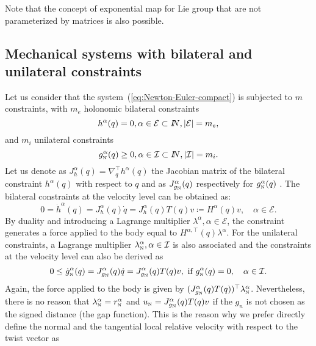 Note that the concept of exponential map for Lie group that are not parameterized by matrices is also possible.


\subsection{Mechanical systems  with bilateral and unilateral constraints}
\label{section22}


Let us consider that the system~(\ref{eq:Newton-Euler-compact}) is  subjected to $m$ constraints, with $m_{e}$ holonomic bilateral 
constraints
\begin{equation}
  \label{eq:bilateral-constraints}
  h^\alpha(q)=0, \alpha \in \mathcal{E}\subset\mbox{\rm $I\!\!N$},  |\mathcal E| = m_e,
\end{equation}
and  $m_{i}$ unilateral constraints
\begin{equation}
  \label{eq:unilateral-constraints}
  g_{{\hbox{\tiny{N}}}}^\alpha(q)\geq 0, \alpha \in \mathcal{I}\subset\mbox{\rm $I\!\!N$},  |\mathcal I| = m_i.
\end{equation} 
%
Let us denote as $J^\alpha_h(q) = \nabla^\top_q h^\alpha(q)  $ the Jacobian matrix of the bilateral constraint $h^\alpha(q)$ with respect to $q$ and as $J^\alpha_{g_{\hbox{\tiny{N}}}}(q)$ respectively for $g_{{\hbox{\tiny{N}}}}^\alpha(q)$  .
%
The bilateral constraints at the velocity level can be obtained as:
\begin{equation}
  \label{eq:bilateral-constraints-velocity}
 0 = \dot h^\alpha(q)= J^\alpha_h(q)\dot q = J^\alpha_h(q) T(q) v \coloneqq H^\alpha(q)  v,\quad  \alpha \in \mathcal{E}.
\end{equation}
By duality and introducing a Lagrange multiplier $\lambda^\alpha, \alpha \in \mathcal E$, the constraint generates a force applied to the body equal to $H^{\alpha,\top}(q)\lambda^\alpha$. For the unilateral constraints, a Lagrange multiplier $\lambda_{{\hbox{\tiny{N}}}}^\alpha, \alpha \in \mathcal I$ is also associated and the constraints at the velocity level can also be derived as
\begin{equation}
  \label{eq:unilateral-constraints-velocity}
 0 \leq  \dot g_{\hbox{\tiny{N}}}^\alpha(q)= J^\alpha_{g_{\hbox{\tiny{N}}}}(q) \dot q = J^\alpha_{g_{\hbox{\tiny{N}}}}(q)  T(q) v , \text{ if } g_{{\hbox{\tiny{N}}}}^\alpha(q) = 0,\quad  \alpha \in \mathcal{I}. 
\end{equation}
Again, the force applied to the body is given by $(J^\alpha_{g_{\hbox{\tiny{N}}}}(q) T(q))^\top\lambda^\alpha_{\hbox{\tiny{N}}}$. {Nevertheless, there is no reason that $\lambda^\alpha_{\hbox{\tiny{N}}} =r^\alpha_{\hbox{\tiny{N}}}$ and $u_{\hbox{\tiny{N}}} = J^\alpha_{g_{\hbox{\tiny{N}}}}(q) T(q) v$ if the $g_n$ is not chosen as the signed distance (the gap function)}. This is the reason why  we prefer  directly define the normal and the tangential local relative velocity with respect to the {twist vector} as
